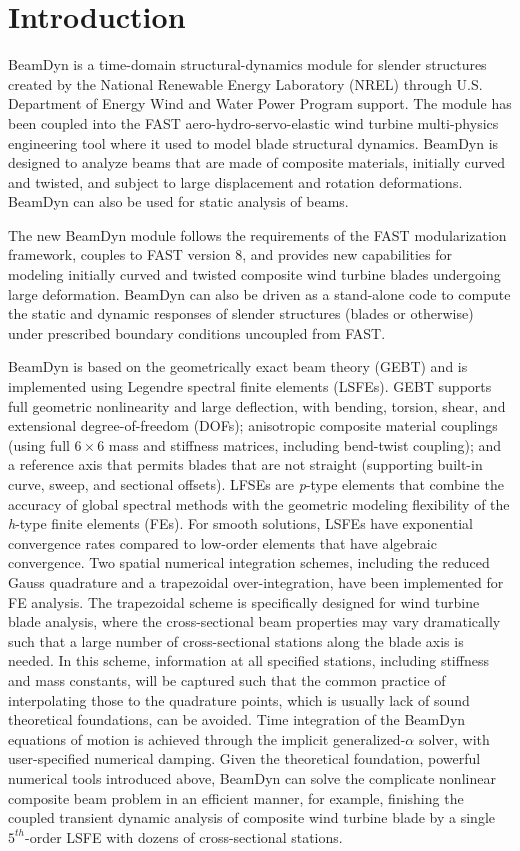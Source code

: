 \chapter{Introduction}
BeamDyn is a time-domain structural-dynamics module for slender structures created by the National Renewable Energy Laboratory (NREL) through U.S. Department of Energy Wind and Water Power Program support. The module has been coupled into the FAST aero-hydro-servo-elastic wind turbine multi-physics engineering tool where it used to model blade structural dynamics. BeamDyn is designed to analyze beams that are made of composite materials, initially curved and twisted, and subject to large displacement and rotation deformations. BeamDyn can also be used for static analysis of beams.

The new BeamDyn module follows the requirements of the FAST modularization framework, couples to FAST version 8, and provides new capabilities for modeling initially curved and twisted composite wind turbine blades undergoing large deformation. BeamDyn can also be driven as a stand-alone code to compute the static and dynamic responses of slender structures (blades or otherwise) under prescribed boundary conditions uncoupled from FAST.

BeamDyn is based on the geometrically exact beam theory (GEBT) and is implemented using Legendre spectral finite elements (LSFEs). GEBT supports full geometric nonlinearity and large deflection, with bending, torsion, shear, and extensional degree-of-freedom (DOFs); anisotropic composite material couplings (using full $6 \times 6$ mass and stiffness matrices, including bend-twist coupling); and a reference axis that permits blades that are not straight (supporting built-in curve, sweep, and sectional offsets). LFSEs are {\it p}-type elements that combine the accuracy of global spectral methods with the geometric modeling flexibility of the {\it h}-type finite elements (FEs). For smooth solutions, LSFEs have exponential convergence rates compared to low-order elements that have algebraic convergence. Two spatial numerical integration schemes, including the reduced Gauss quadrature and a trapezoidal over-integration, have been implemented for FE analysis. The trapezoidal scheme is specifically designed for wind turbine blade analysis, where the cross-sectional beam properties may vary dramatically such that a large number of cross-sectional stations along the blade axis is needed. In this scheme, information at all specified stations, including stiffness and mass constants, will be captured such that the common practice of interpolating those to the quadrature points, which is usually lack of sound theoretical foundations, can be avoided. Time integration of the BeamDyn equations of motion is achieved through the implicit generalized-$\alpha$ solver, with user-specified numerical damping. Given the theoretical foundation, powerful numerical tools introduced above, BeamDyn can solve the complicate nonlinear composite beam problem in an efficient manner, for example, finishing the coupled transient dynamic analysis of composite wind turbine blade by a single $5^{th}$-order LSFE with dozens of cross-sectional stations. 

